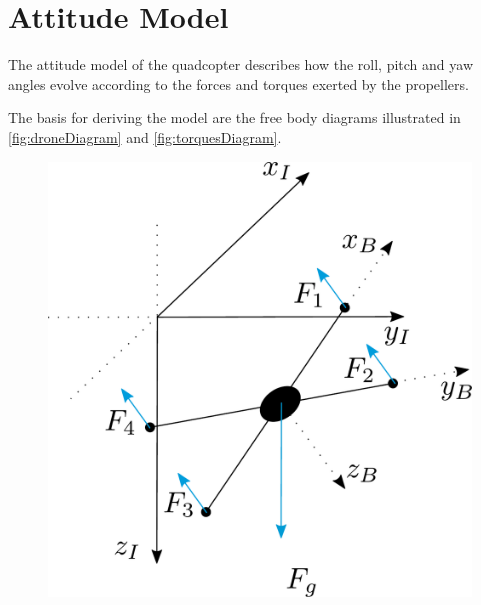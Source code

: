 \section{Attitude Model} \label{sec:AttitudeModel}
The attitude model of the quadcopter describes how the roll, pitch and yaw angles evolve according to the forces and torques exerted by the propellers. 

The basis for deriving the model are the free body diagrams illustrated in \autoref{fig:droneDiagram} and \ref{fig:torquesDiagram}. 

\begin{minipage}{\linewidth}
	\begin{minipage}{0.6\linewidth}
		\begin{figure}[H]
			\includegraphics[scale=.4]{figures/droneDiagram}
			\centering
			

\end{figure}
\end{minipage}
\end{minipage}
